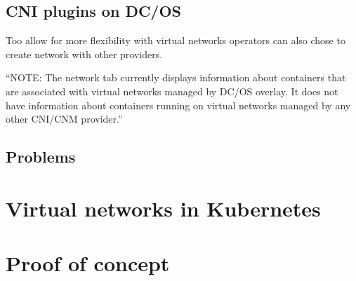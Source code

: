 \subsection{CNI plugins on DC/OS}
\label{subsec:dcos-cni}
Too allow for more flexibility with virtual networks operators can also chose to create network with other providers.
\begin{displayquote}
    ``NOTE: The network tab currently displays information about containers that are associated with virtual networks managed by DC/OS overlay. It does not have information about containers running on virtual networks managed by any other CNI/CNM provider.'' %
\end{displayquote}



\subsection{Problems}
\label{subsec:problems}

\section{Virtual networks in Kubernetes}
\label{sec:k8s-virtual-networks}

\section{Proof of concept}
\label{sec:proof-of-concept}

